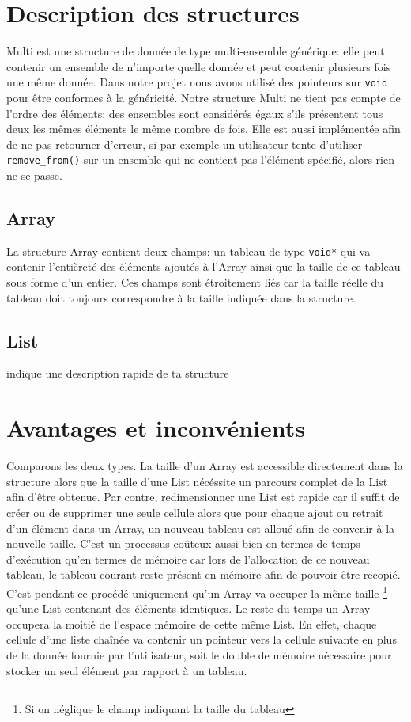 \documentclass[a4paper, 11pt, oneside]{article}
\begin{document}
	\clearpage
\section{Description des structures}
	Multi est une structure de donnée de type multi-ensemble générique: elle peut contenir un ensemble de n'importe quelle donnée et peut contenir plusieurs fois une même donnée. Dans notre projet nous avons utilisé des pointeurs sur \texttt{void} pour être conformes à la généricité. Notre structure Multi ne tient pas compte de l'ordre des éléments: des ensembles sont considérés égaux s'ils présentent tous deux les mêmes éléments le même nombre de fois. Elle est aussi implémentée afin de ne pas retourner d'erreur, si par exemple un utilisateur tente d'utiliser \texttt{remove\_from()} sur un ensemble qui ne contient pas l'élément spécifié, alors rien ne se passe.
	\subsection{Array}
		La structure Array contient deux champs: un tableau de type \texttt{void*} qui va contenir l'entièreté des éléments ajoutés à l'Array ainsi que la taille de ce tableau sous forme d'un entier. Ces champs sont étroitement liés car la taille réelle du tableau doit toujours correspondre à la taille indiquée dans la structure.
	\subsection{List}
		\color{blue} indique une description rapide de ta structure \color{black}
	
\section{Avantages et inconvénients}
	Comparons les deux types. La taille d'un Array est accessible directement dans la structure alors que la taille d'une List nécéssite un parcours complet de la List afin d'être obtenue. Par contre, redimensionner une List est rapide car il suffit de créer ou de supprimer une seule cellule alors que pour chaque ajout ou retrait d'un élément dans un Array, un nouveau tableau est alloué afin de convenir à la nouvelle taille. C'est un processus coûteux aussi bien en termes de temps d'exécution qu'en termes de mémoire car lors de l'allocation de ce nouveau tableau, le tableau courant reste présent en mémoire afin de pouvoir être recopié. C'est pendant ce procédé uniquement qu'un Array va occuper la même taille \footnote{Si on néglique le champ indiquant la taille du tableau} qu'une List contenant des éléments identiques. Le reste du temps un Array occupera la moitié de l'espace mémoire de cette même List. En effet, chaque cellule d'une liste chaînée va contenir un pointeur vers la cellule suivante en plus de la donnée fournie par l'utilisateur, soit le double de mémoire nécessaire pour stocker un seul élément par rapport à un tableau.
	
\end{document}
